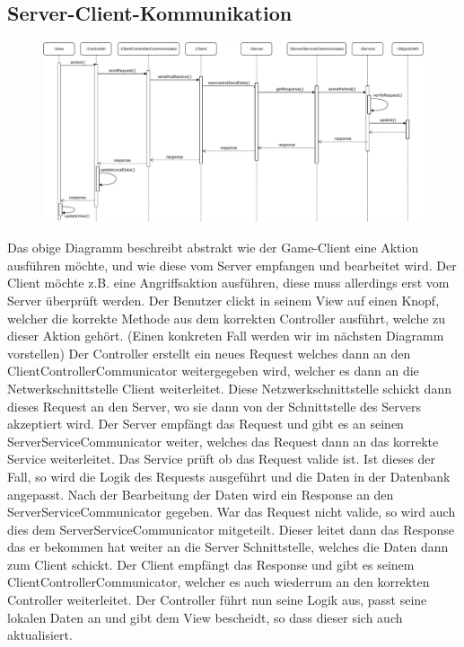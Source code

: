 \documentclass[fontsize=12pt,paper=a4,twoside]{scrartcl}
\begin{document}
\subsection{Server-Client-Kommunikation}

\begin{figure}[H]
\begin{center}
  \includegraphics[width=\linewidth]{UML/Server_client_Sequenzdiagramm.pdf}
\end{center}
\end{figure}

Das obige Diagramm beschreibt abstrakt wie der Game-Client eine Aktion ausführen möchte, und wie diese vom Server empfangen und bearbeitet wird.
Der Client möchte z.B. eine Angriffsaktion ausführen, diese muss allerdings erst vom Server überprüft werden. Der Benutzer clickt in seinem View auf einen Knopf, welcher die 
korrekte Methode aus dem korrekten Controller ausführt, welche zu dieser Aktion gehört. (Einen konkreten Fall werden wir im nächsten Diagramm vorstellen)
Der Controller erstellt ein neues Request welches dann an den ClientControllerCommunicator weitergegeben wird, welcher es dann an die Netwerkschnittstelle Client weiterleitet. Diese Netzwerkschnittstelle schickt dann dieses Request an den Server, wo sie dann von der Schnittstelle des Servers akzeptiert wird. Der Server empfängt das Request und gibt es an seinen ServerServiceCommunicator weiter, welches das Request dann an das korrekte Service weiterleitet. Das Service prüft ob das Request valide ist. Ist dieses der Fall, so wird die Logik des Requests ausgeführt und die Daten in der Datenbank angepasst. Nach der Bearbeitung der Daten wird ein Response an den ServerServiceCommunicator gegeben. War das Request nicht valide, so wird auch dies dem ServerServiceCommunicator mitgeteilt. Dieser leitet dann das Response das er bekommen hat weiter an die Server Schnittstelle, welches die Daten dann zum Client schickt. Der Client empfängt das Response und gibt es seinem ClientControllerCommunicator, welcher es auch wiederrum an den korrekten Controller weiterleitet. Der Controller führt nun seine Logik aus, passt seine lokalen Daten an und gibt dem View bescheidt, so dass dieser sich auch aktualisiert.
\end{document}

